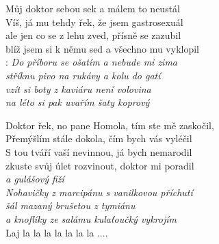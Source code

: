 
Můj doktor sebou sek a málem to neustál\\
Víš, já mu tehdy řek, že jsem gastrosexuál\\
ale jen co se z lehu zved, přísně se zazubil\\
blíž jsem si k němu sed a všechno mu vyklopil\\

\textregistered:
\emph{
Do příboru se ošatím a nebude mi zima\hspace{0.5cm}\\
stříknu pivo na rukávy a kolu do gatí\hspace{1.5cm}\\
vzít si boty z kaviáru není volovina\\
na léto si pak uvařím šaty koprový\\ 
}

Doktor řek, no pane Homola, tím ste mě zaskočil,\\
Přemýšlím stále dokola, čím bych vás vyléčil\\
S tou tváří vaší nevinnou, já bych nemarodil\\
zkuste svůj úlet rozvinout, doktor mi poradil\\

\textregistered \emph{a gulášový fiží\\
Nohavičky z marcipánu s vanilkovou příchutí\\
šál mazaný brušetou z tymiánu\\
a knoflíky ze salámu kulaťoučký vykrojím}\\

Laj la la la la la la la ....\\

\textregistered

\newpage
